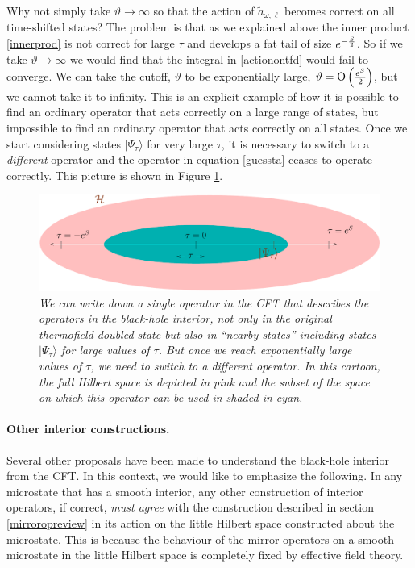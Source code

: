 \documentclass[12pt]{article}
\newcommand{\tfdtau}{\Psi_{\tau}} %
\newcommand{\cop}[1]{#1}
\def\ta{\widetilde{\cop{a}}}
\def\cutoffT{\vartheta}
\def\Or[#1]{{\text{O}}\left({#1}\right)}
\begin{document}
Why not simply take $\cutoffT \rightarrow \infty$ so that the action of $\ta_{\omega, \ell}$ becomes correct on all time-shifted states? The problem is that as we explained above the inner product \eqref{innerprod} is not correct for large $\tau$ and develops a fat tail of size $e^{-{S \over 2}}$. So if we take $\cutoffT \rightarrow \infty$ we would find that the integral in \eqref{actionontfd} would fail to converge. We can take the cutoff, $\cutoffT$ to be exponentially large, $\cutoffT = \Or[e^{S \over 2}]$, but we cannot take it to infinity. This is an explicit example of how it is possible to find
an ordinary  operator that acts correctly on a large range of states, but impossible to find an ordinary  operator that acts correctly on all states. Once we start considering states $|\tfdtau \rangle$ for very large $\tau$, it is necessary to switch to a {\em different} operator and the operator in equation \eqref{guessta} ceases to operate correctly. This picture is shown in Figure \ref{tshiftpatches}.
\begin{figure}[!ht]
\begin{center}
\includegraphics[width=\textwidth]{tshiftpatcheshpsi.pdf}
\caption{\em We can write down a single operator in the CFT that describes the operators in the black-hole interior, not only in the original thermofield doubled state but also in ``nearby states'' including states $|\tfdtau \rangle$ for large values of $\tau$. But once we reach exponentially large values of $\tau$, we need to switch to a different operator. In this cartoon, the full Hilbert space is depicted in pink and the subset of the space on which this operator can be used in shaded in cyan. \label{tshiftpatches}}
\end{center}
\end{figure}











 


\paragraph{\bf Other interior constructions.}
Several other proposals have been made to understand the black-hole interior from the CFT. In this context, we would like to emphasize the following. In any microstate that has a smooth interior, any other construction of interior operators, if correct, {\em must agree} with the construction described in section \ref{mirroropreview} in its action on the little Hilbert space constructed about the microstate. This is because the behaviour of the mirror operators on a smooth microstate in the little Hilbert space is completely fixed by effective field theory. 
\end{document}
